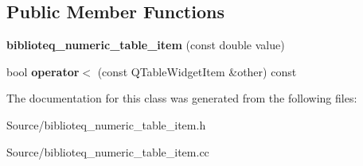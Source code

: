 \subsection*{Public Member Functions}
\begin{DoxyCompactItemize}
\item 
{\bfseries biblioteq\+\_\+numeric\+\_\+table\+\_\+item} (const double value)\hypertarget{classbiblioteq__numeric__table__item_ac41efd6ef59444e51966d3011ae9a12b}{}\label{classbiblioteq__numeric__table__item_ac41efd6ef59444e51966d3011ae9a12b}

\item 
bool {\bfseries operator$<$} (const Q\+Table\+Widget\+Item \&other) const \hypertarget{classbiblioteq__numeric__table__item_af0e10188fa652bd0e8ebc952a05ae81c}{}\label{classbiblioteq__numeric__table__item_af0e10188fa652bd0e8ebc952a05ae81c}

\end{DoxyCompactItemize}


The documentation for this class was generated from the following files\+:\begin{DoxyCompactItemize}
\item 
Source/biblioteq\+\_\+numeric\+\_\+table\+\_\+item.\+h\item 
Source/biblioteq\+\_\+numeric\+\_\+table\+\_\+item.\+cc\end{DoxyCompactItemize}
